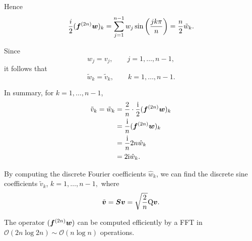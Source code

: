 Hence
\begin{equation*}
  \frac{i}{2} ( {\boldsymbol f}^{(2n)} \boldsymbol w)_k =
  \sum_{j=1}^{n-1} w_j \sin \left( \frac{j k \pi}{n} \right) = \frac{n}{2} \tilde{w}_k.
\end{equation*}

Since
\begin{equation*}
  w_j=v_j, \qquad j=1,\ldots,n-1,
\end{equation*}
it follows that
\begin{equation*}
  \widetilde{w}_k = \widetilde{v}_k, \qquad k=1,\ldots,n-1.
\end{equation*}

In summary, for $k=1,\ldots,n-1$,
\begin{align*}
  \tilde{v}_k = \tilde{w}_k
  &= \frac{2}{n} \cdot \frac{\text{i}}{2} ({\boldsymbol f}^{(2n)} \boldsymbol w)_k \\
  &= \frac{\text{i}}{n} ({\boldsymbol f}^{(2n)} \boldsymbol w)_k \\
  &= \frac{\text{i}}{n} 2n \hat{w}_k \\
  &= 2\text{i} \hat{w}_k.
\end{align*}

By computing the discrete Fourier coefficients $\hat{w}_k$, we can find the
discrete sine coefficients $\widetilde{v}_k$, $k=1,\ldots,n-1,$ where
\begin{equation*}
  \tilde{\boldsymbol v} = \boldsymbol S \boldsymbol v = \sqrt{\frac{2}{n}} {\mathrm Q} \boldsymbol v.
\end{equation*}

The operator $({\boldsymbol f}^{(2n)} \boldsymbol w)$ can be computed efficiently by a FFT in
$\mathcal{O}(2n \log 2n) \sim \mathcal{O} (n \log n)$ operations.

